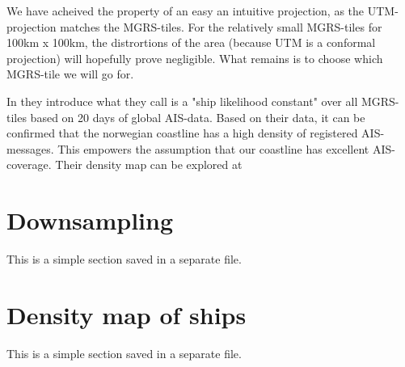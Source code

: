 We have acheived the property of an easy an intuitive projection, as the UTM-projection matches the MGRS-tiles. For the relatively small MGRS-tiles for 100km x 100km, the distrortions of the area (because UTM is a conformal projection) will hopefully prove negligible. What remains is to choose which MGRS-tile we will go for. 

In \cite{Tofting2018} they introduce what they call is a "ship likelihood constant" over all MGRS-tiles based on 20 days of global AIS-data. Based on their data, it can be confirmed that the norwegian coastline has a high density of registered AIS-messages. This empowers the assumption that our coastline has excellent AIS-coverage. Their density map can be explored at \cite{Tofting}




\section{Downsampling}
\begin{info}{}
	This is a simple section saved in a separate file.
\end{info}







\section{Density map of ships}
\begin{info}{}
	This is a simple section saved in a separate file.
\end{info}





